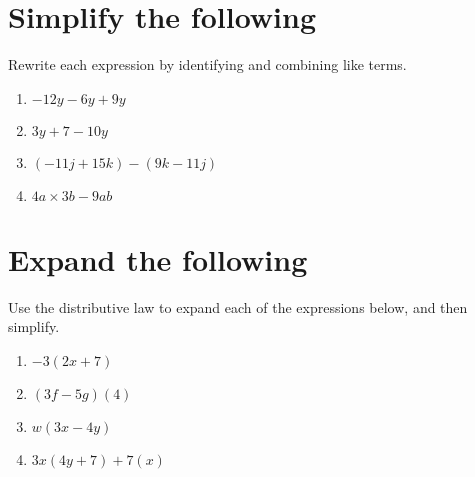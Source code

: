 \documentclass[12pt,letterpaper]{article}
\begin{document}
\section*{Simplify the following}
Rewrite each expression by identifying and combining like terms.
\begin{enumerate}

\item $-12y - 6y + 9y$

\addvspace{0.7in}

\item $3y + 7 - 10y$

\addvspace{0.7in}

\item $(-11j + 15k) - (9k - 11j)$

\addvspace{0.7in}

\item $4a \times 3b - 9ab$

\addvspace{0.7in}
\end{enumerate}

\section*{Expand the following}
Use the distributive law to expand each of the expressions below, and then simplify.
\begin{enumerate}
\item $-3(2x + 7)$

\addvspace{0.7in}

\item $(3f - 5g)(4)$

\addvspace{0.7in}

\item $w(3x - 4y)$

\addvspace{0.7in}

\item $3x(4y + 7) + 7(x)$

\addvspace{1in}
\end{enumerate}
\end{document}
